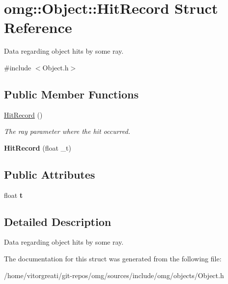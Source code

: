 \hypertarget{structomg_1_1_object_1_1_hit_record}{}\section{omg\+::Object\+::Hit\+Record Struct Reference}
\label{structomg_1_1_object_1_1_hit_record}


Data regarding object hits by some ray.  




{\ttfamily \#include $<$Object.\+h$>$}

\subsection*{Public Member Functions}
\begin{DoxyCompactItemize}
\item 
\mbox{\label{structomg_1_1_object_1_1_hit_record_a3f21e80674a9fadbeeac8f3fa14912d1}} 
\mbox{\hyperlink{structomg_1_1_object_1_1_hit_record_a3f21e80674a9fadbeeac8f3fa14912d1}{Hit\+Record}} ()
\begin{DoxyCompactList}\small\item\em The ray parameter where the hit occurred. \end{DoxyCompactList}\item 
\mbox{\label{structomg_1_1_object_1_1_hit_record_a79b2b8de29c53b59f3814f3dabfd90fc}} 
{\bfseries Hit\+Record} (float \+\_\+t)
\end{DoxyCompactItemize}
\subsection*{Public Attributes}
\begin{DoxyCompactItemize}
\item 
\mbox{\label{structomg_1_1_object_1_1_hit_record_ab5d0261eb41f0ed5f3c4a4f2f39dc34e}} 
float {\bfseries t}
\end{DoxyCompactItemize}


\subsection{Detailed Description}
Data regarding object hits by some ray. 

The documentation for this struct was generated from the following file\+:\begin{DoxyCompactItemize}
\item 
/home/vitorgreati/git-\/repos/omg/sources/include/omg/objects/Object.\+h\end{DoxyCompactItemize}
